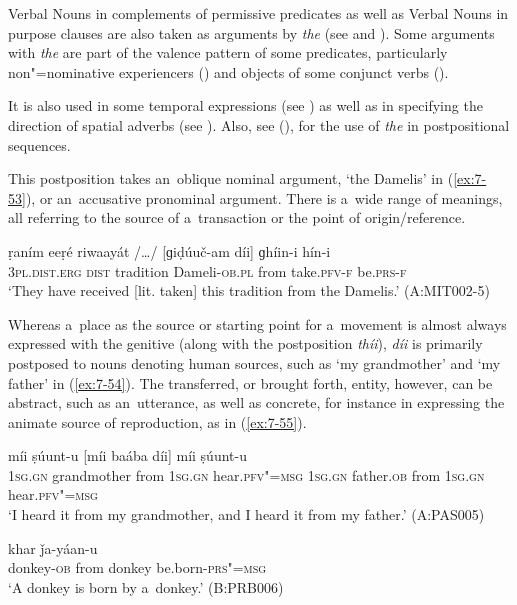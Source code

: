 Verbal Nouns in complements of permissive predicates as well as Verbal Nouns in purpose clauses are also taken as arguments by \textit{the} (see  and ). Some arguments with \textit{the} are part of the valence pattern of some predicates, particularly non"=nominative experiencers () and objects of some conjunct verbs (). 


It is also used in some temporal expressions (see ) as well as in specifying the direction of spatial adverbs (see ). Also, see (), for the use of \textit{the} in postpositional sequences. 


 This postposition takes an~oblique nominal argument, `the Damelis' in (\ref{ex:7-53}), or an~accusative pronominal argument. There is a~wide range of meanings, all referring to the source of a~transaction or the point of origin/reference.

\begin{exe}
\ex
\label{ex:7-53}
\gll ṛaním eeṛé riwaayát /{\ldots}/ [ɡiḍúuč-am díi]  ɡhíin-i hín-i \\
\textsc{3pl.dist.erg} \textsc{dist} tradition {} Dameli-\textsc{ob.pl} from take.\textsc{pfv-f} be.\textsc{prs-f}\\
\glt `They have received [lit. taken] this tradition from the Damelis.' (A:MIT002-5)
\end{exe}

Whereas a~place as the source or starting point for a~movement is almost always expressed with the genitive (along with the postposition \textit{thíi}), \textit{díi} is primarily postposed to nouns denoting human sources, such as `my grandmother' and `my father' in (\ref{ex:7-54}). The transferred, or brought forth, entity, however, can be abstract, such as an~utterance, as well as concrete, for instance in expressing the animate source of reproduction, as in (\ref{ex:7-55}).

\begin{exe}
\ex
\label{ex:7-54}
 míi ṣúunt-u [míi  baába díi] míi
ṣúunt-u \\
\textsc{1sg.gn} grandmother from \textsc{1sg.gn} hear.\textsc{pfv"=msg} \textsc{1sg.gn} father.\textsc{ob} from \textsc{1sg.gn} hear.\textsc{pfv"=msg}\\
\glt `I heard it from my grandmother, and I heard it from my father.' (A:PAS005)

\ex
\label{ex:7-55}
 khar ǰa-yáan-u \\
donkey-\textsc{ob} from donkey be.born\textsf{-}\textsc{prs"=msg} \\
\glt `A donkey is born by a~donkey.' (B:PRB006)
\end{exe}

